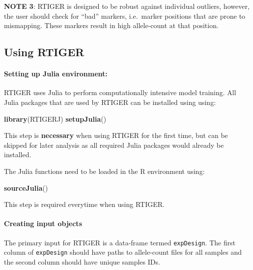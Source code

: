\documentclass[]{article}
\newenvironment{Shaded}{\begin{snugshade}}{\end{snugshade}}
\newcommand{\KeywordTok}[1]{\textcolor[rgb]{0.13,0.29,0.53}{\textbf{#1}}}
\newcommand{\NormalTok}[1]{#1}
\let\oldparagraph\paragraph
\renewcommand{\paragraph}[1]{\oldparagraph{#1}\mbox{}}
\begin{document}
\textbf{NOTE 3}: RTIGER is designed to be robust against individual
outliers, however, the user should check for ``bad'' markers,
i.e.~marker positions that are prone to mismapping. These markers result
in high allele-count at that position.

\hypertarget{using-rtiger}{%
\subsection{Using RTIGER}\label{using-rtiger}}

\hypertarget{setting-up-julia-environment}{%
\paragraph{Setting up Julia
environment:}\label{setting-up-julia-environment}}

RTIGER uses Julia to perform computationally intensive model training.
All Julia packages that are used by RTIGER can be installed using using:

\begin{Shaded}
\begin{Highlighting}[]
\KeywordTok{library}\NormalTok{(RTIGERJ)}
\KeywordTok{setupJulia}\NormalTok{()}
\end{Highlighting}
\end{Shaded}

This step is \textbf{necessary} when using RTIGER for the first time,
but can be skipped for later analysis as all required Julia packages
would already be installed.

The Julia functions need to be loaded in the R environment using:

\begin{Shaded}
\begin{Highlighting}[]
\KeywordTok{sourceJulia}\NormalTok{()}
\end{Highlighting}
\end{Shaded}

This step is required everytime when using RTIGER.

\hypertarget{creating-input-objects}{%
\paragraph{Creating input objects}\label{creating-input-objects}}

The primary input for RTIGER is a data-frame termed \texttt{expDesign}.
The first column of \texttt{expDesign} should have paths to allele-count
files for all samples and the second column should have unique samples
IDs.
\end{document}
